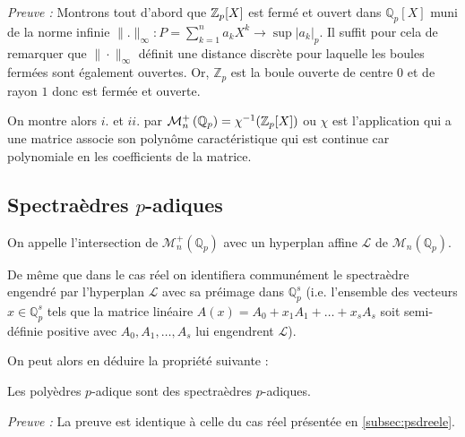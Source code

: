 \textit{Preuve :}  
Montrons tout d'abord que $\Zp[X]$ est fermé et ouvert dans $\mathbb{Q}_{ p }[X] $ muni de la norme infinie $\|.\|_\infty : P = \sum_{k=1}^{n} a_k X^k \to \sup |a_k|_p$. Il suffit pour cela de remarquer que $\|\cdot \|_\infty$  définit une distance discrète pour laquelle les boules fermées sont également ouvertes. Or, $\mathbb{Z}_p$ est la boule ouverte de centre $0$ et de rayon $1$ donc est fermée et ouverte.
\iffalse
Soit $P \in \Zp[X]$. On peut alors montrer que la boule ouverte de centre $P$ et de rayon $1$ est incluse dans $\Zp[X]$. Pour ce faire on considère $Q \in B_{o}\left( P,1 \right)_\infty $ et on remarque que cela signifie que $\|Q-P\|_\infty \le 1$ c'est-à-dire $Q-P \in \Zp[X]$. On a donc $Q = P + P-Q \in \Zp[X]$. 
$\Zp[X]$ est donc ouvert.

Maintenant soit $P \in \mathbb{Q}_{ p } [X]^c$ et $Q \in B_o\left( P, 1 \right) $. On note $P = \sum_{k=1}^{n} a_k X^k$ et $Q = \sum_{k=1}^{n} a_k X^k$. On dispose alors de $i in \left\{  1,\ldots,n \right\} $ tel que $|a_{i}|_p >1$ et $a_i + b_{i} \in \Zp$ (car $P-Q \in \Zp$). Donc on a nécessairement $|b_i|_p = |a_i|_p > 1$ et $Q \in Z_p[X]^c$.
Donc $\Zp[X]^c$ est ouvert et $\Zp[X]$ est fermé. 

\fi
On montre alors $i.$ et $ii.$ par $\mathcal{M}^+_{n}\left(\mathbb{Q}_{p} \right)  = \chi^{-1}(  \mathbb {Z}_p [X]) $ ou $\chi$ est l'application qui a une matrice associe son polynôme caractéristique qui est continue car polynomiale en les coefficients de la matrice.

%

\subsection{Spectraèdres \texorpdfstring{$p$}{p}-adiques} 
\begin{definition}
	On appelle  l'intersection de $\mathcal{M}_n^+\left( \mathbb{Q}_{p} \right) $ avec un hyperplan affine $\mathcal{L}$ de $\mathcal{M}_n\left( \mathbb{Q}_{p} \right) $.
\end{definition}

\begin{remarque}
	De même que dans le cas réel on identifiera communément le spectraèdre engendré par l'hyperplan $\mathcal{L}$ avec sa préimage dans $\mathbb{Q}_{p}^s$ (i.e. l'ensemble des vecteurs $x \in \mathbb{Q}_{p} ^s$ tels que la matrice linéaire $A(x) = A_0 + x_1A_1 + \ldots + x_sA_s$ soit semi-définie positive avec $A_0,A_1,\ldots,A_s$ lui engendrent $\mathcal{L}$). 
\end{remarque}
On peut alors en déduire la propriété suivante :
\begin{propriete}
	Les polyèdres $p$-adique sont des spectraèdres $p$-adiques.
\end{propriete}
\textit{Preuve :}
La preuve est identique à celle du cas réel présentée en \ref{subsec:psdreele}. 



